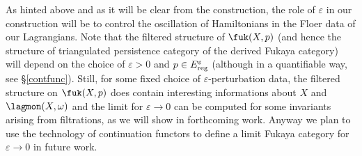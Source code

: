 	\begin{rem}
		As hinted above and as it will be clear from the construction, the role of $\varepsilon$ in our construction will be to control the oscillation of Hamiltonians in the Floer data of our Lagrangians. Note that the filtered structure of $\fuk(X,p)$ (and hence the structure of triangulated persistence category \cite{BCZ:tpc} of the derived Fukaya category) will depend on the choice of $\varepsilon>0$ and $p\in E^\varepsilon_\textnormal{reg}$ (although in a quantifiable way, see \S \ref{contfunc}). Still, for some fixed choice of $\varepsilon$-perturbation data, the filtered structure on $\fuk(X,p)$ does contain interesting informations about $X$ and $\lagmon(X,\omega)$ and the limit for $\varepsilon\to 0$ can be computed for some invariants arising from filtrations, as we will show in forthcoming work. Anyway we plan to use the technology of continuation functors to define a limit Fukaya category for $\varepsilon\to 0$ in future work.
	\end{rem}
	
	
	
	
	
